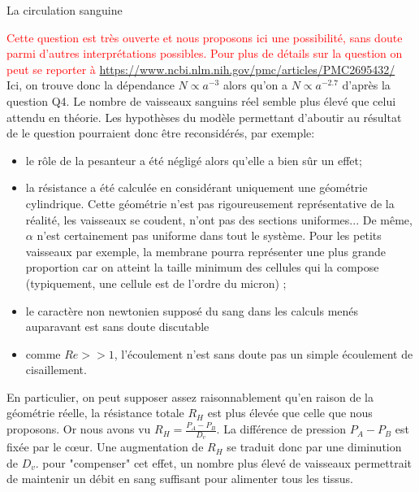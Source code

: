 \begin{exo}[PC][1][devoir]{La circulation sanguine}
\begin{quest}
  {
  \textcolor{red}{Cette question est très ouverte et nous proposons ici une possibilité, sans doute parmi d'autres interprétations possibles. Pour plus de détails sur la question on peut se reporter à \url{https://www.ncbi.nlm.nih.gov/pmc/articles/PMC2695432/} } \\
  Ici, on trouve donc la dépendance $N \propto a^{-3}$ alors qu'on a $N \propto a^{-2.7}$ d'après la question Q4. Le nombre de vaisseaux sanguins réel semble plus élevé que celui attendu en théorie. Les hypothèses du modèle permettant d'aboutir au résultat de le question pourraient donc être reconsidérés, par exemple:
  \begin{itemize}
  \item le rôle de la pesanteur a été négligé alors qu'elle a bien sûr un effet;
  \item la résistance a été calculée en considérant uniquement une géométrie cylindrique. Cette géométrie n'est pas rigoureusement représentative de la réalité, les vaisseaux se coudent, n'ont pas des sections uniformes... De même, $\alpha$ n'est certainement pas uniforme dans tout le système. Pour les petits vaisseaux par exemple, la membrane pourra représenter une plus grande proportion car on atteint la taille minimum des cellules qui la compose (typiquement, une cellule est de l'ordre du micron) ;
  \item le caractère non newtonien supposé du sang dans les calculs menés auparavant est sans doute discutable
  \item comme $Re>>1$, l'écoulement n'est sans doute pas un simple écoulement de cisaillement.
  \end{itemize}
  En particulier, on peut supposer assez raisonnablement qu'en raison de la géométrie réelle, la résistance totale $R_{H}$ est plus élevée que celle que nous proposons. Or nous avons vu $R_{H}=\frac{P_{A}-P_{B}}{D_{v}}$. La différence de pression $P_{A}-P_{B}$ est fixée par le c\oe ur. Une augmentation de $R_{H}$ se traduit donc par une diminution de $D_{v}$. pour "compenser" cet effet, un nombre plus élevé de vaisseaux permettrait de maintenir un débit en sang suffisant pour alimenter tous les tissus.
  }
\end{quest}

\end{exo}

